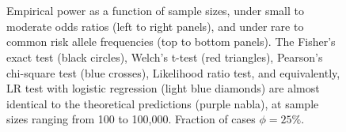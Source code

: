 \begin{figure}[!tpb]
{        }\\ %
        \\ %
\caption{Empirical power as a function of sample sizes, under small to moderate odds ratios (left to right panels), and under rare to common risk allele frequencies (top to bottom panels).
The Fisher's exact test (black circles), Welch's t-test (red triangles), Pearson's chi-square test (blue crosses), Likelihood ratio test, and equivalently, LR test with logistic regression (light blue diamonds) are almost identical to the theoretical predictions (purple nabla), at sample sizes ranging from 100 to 100,000. Fraction of cases $\phi = 25\%$.
}\label{fig:compare-phi025}
\end{figure}


